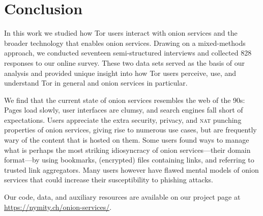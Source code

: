 \section{Conclusion}
\label{sec:conclusion}

In this work we studied how Tor users interact with onion services and the
broader technology that enables onion services.  Drawing on a mixed-methods
approach, we conducted seventeen semi-structured interviews and collected 828
responses to our online survey.  These two data sets served as the basis of our
analysis and provided unique insight into how Tor users perceive, use, and
understand Tor in general and onion services in particular.

We find that the current state of onion services resembles the web of the 90s:
Pages load slowly, user interfaces are clumsy, and search engines fall short of
expectations.  Users appreciate the extra security, privacy, and \textsc{nat}
punching properties of onion services, giving rise to numerous use cases, but
are frequently wary of the content that is hosted on them.  Some users found
ways to manage what is perhaps the most striking idiosyncracy of onion
services---their domain format---by using bookmarks, (encrypted) files
containing links, and referring to trusted link aggregators.  Many users however
have flawed mental models of onion services that could increase their
susceptibility to phishing attacks.

Our code, data, and auxiliary resources are available on our project page at
\url{https://nymity.ch/onion-services/}.
